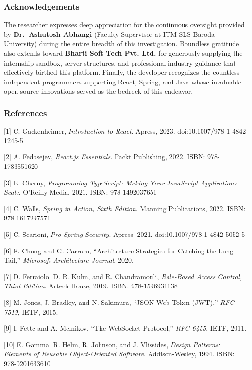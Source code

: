 \subsubsection*{Acknowledgements}\label{acknowledgements}

The researcher expresses deep appreciation for the continuous oversight
provided by \textbf{Dr.~Ashutosh Abhangi} (Faculty Supervisor at ITM SLS
Baroda University) during the entire breadth of this investigation.
Boundless gratitude also extends toward \textbf{Bharti Soft Tech Pvt.
Ltd.} for generously supplying the internship sandbox, server
structures, and professional industry guidance that effectively birthed
this platform. Finally, the developer recognizes the countless
independent programmers supporting React, Spring, and Java whose
invaluable open-source innovations served as the bedrock of this
endeavor.

\subsubsection*{References}\label{references}

{[}1{]} C. Gackenheimer, \emph{Introduction to React}. Apress, 2023.
doi:10.1007/978-1-4842-1245-5

{[}2{]} A. Fedosejev, \emph{React.js Essentials}. Packt Publishing,
2022. ISBN: 978-1783551620

{[}3{]} B. Cherny, \emph{Programming TypeScript: Making Your JavaScript
Applications Scale}. O'Reilly Media, 2021. ISBN: 978-1492037651

{[}4{]} C. Walls, \emph{Spring in Action, Sixth Edition}. Manning
Publications, 2022. ISBN: 978-1617297571

{[}5{]} C. Scarioni, \emph{Pro Spring Security}. Apress, 2021.
doi:10.1007/978-1-4842-5052-5

{[}6{]} F. Chong and G. Carraro, ``Architecture Strategies for Catching
the Long Tail,'' \emph{Microsoft Architecture Journal}, 2020.

{[}7{]} D. Ferraiolo, D. R. Kuhn, and R. Chandramouli, \emph{Role-Based
Access Control, Third Edition}. Artech House, 2019. ISBN: 978-1596931138

{[}8{]} M. Jones, J. Bradley, and N. Sakimura, ``JSON Web Token (JWT),''
\emph{RFC 7519}, IETF, 2015.

{[}9{]} I. Fette and A. Melnikov, ``The WebSocket Protocol,'' \emph{RFC
6455}, IETF, 2011.

{[}10{]} E. Gamma, R. Helm, R. Johnson, and J. Vlissides, \emph{Design
Patterns: Elements of Reusable Object-Oriented Software}.
Addison-Wesley, 1994. ISBN: 978-0201633610


